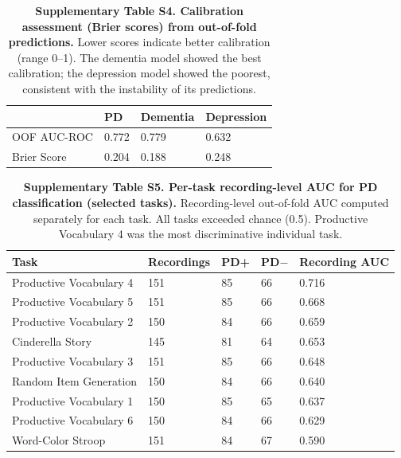 \documentclass[11pt,a4paper]{article}
\begin{document}
\vspace{2em}

\begin{table}[H]
\centering
\caption{\textbf{Supplementary Table S4. Calibration assessment (Brier scores) from out-of-fold predictions.} Lower scores indicate better calibration (range 0--1). The dementia model showed the best calibration; the depression model showed the poorest, consistent with the instability of its predictions.}
\label{tab:brier}
\vspace{0.5em}
\begin{tabular}{l C{2cm} C{2cm} C{2cm}}
\toprule
 & \textbf{PD} & \textbf{Dementia} & \textbf{Depression} \\
\midrule
OOF AUC-ROC & 0.772 & 0.779 & 0.632 \\
Brier Score & 0.204 & 0.188 & 0.248 \\
\bottomrule
\end{tabular}
\end{table}

\vspace{2em}

\begin{table}[H]
\centering
\caption{\textbf{Supplementary Table S5. Per-task recording-level AUC for PD classification (selected tasks).} Recording-level out-of-fold AUC computed separately for each task. All tasks exceeded chance (0.5). Productive Vocabulary 4 was the most discriminative individual task.}
\label{tab:pertask}
\vspace{0.5em}
\begin{tabular}{l C{2cm} C{1.5cm} C{1.5cm} C{2.5cm}}
\toprule
\textbf{Task} & \textbf{Recordings} & \textbf{PD+} & \textbf{PD$-$} & \textbf{Recording AUC} \\
\midrule
Productive Vocabulary 4 & 151 & 85 & 66 & 0.716 \\
Productive Vocabulary 5 & 151 & 85 & 66 & 0.668 \\
Productive Vocabulary 2 & 150 & 84 & 66 & 0.659 \\
Cinderella Story & 145 & 81 & 64 & 0.653 \\
Productive Vocabulary 3 & 151 & 85 & 66 & 0.648 \\
Random Item Generation & 150 & 84 & 66 & 0.640 \\
Productive Vocabulary 1 & 150 & 85 & 65 & 0.637 \\
Productive Vocabulary 6 & 150 & 84 & 66 & 0.629 \\
Word-Color Stroop & 151 & 84 & 67 & 0.590 \\
\bottomrule
\end{tabular}
\end{table}
\end{document}
